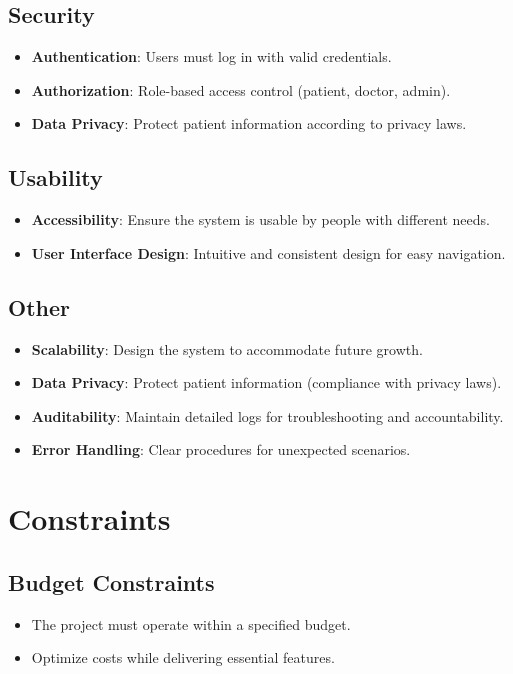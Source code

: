 \documentclass[a4paper, 12pt]{article}
\begin{document}
\subsection{Security}
\begin{itemize}
    \item \textbf{Authentication}: Users must log in with valid credentials.
    \item \textbf{Authorization}: Role-based access control (patient, doctor, admin).
    \item \textbf{Data Privacy}: Protect patient information according to privacy laws.
\end{itemize}

\subsection{Usability}
\begin{itemize}
    \item \textbf{Accessibility}: Ensure the system is usable by people with different needs.
    \item \textbf{User Interface Design}: Intuitive and consistent design for easy navigation.
\end{itemize}

\subsection{Other}
\begin{itemize}
    \item \textbf{Scalability}: Design the system to accommodate future growth.
    \item \textbf{Data Privacy}: Protect patient information (compliance with privacy laws).
    \item \textbf{Auditability}: Maintain detailed logs for troubleshooting and accountability.
    \item \textbf{Error Handling}: Clear procedures for unexpected scenarios.
\end{itemize}

\section{Constraints}
\subsection{Budget Constraints}
\begin{itemize}
    \item The project must operate within a specified budget.
    \item Optimize costs while delivering essential features.
\end{itemize}
\end{document}
